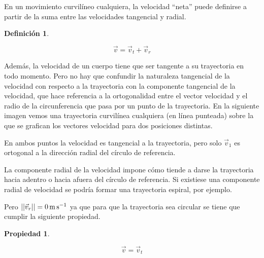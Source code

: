 \documentclass[a5paper,12pt,twoside]{book}
\newtheorem{defn}{{Definición}}[chapter]
\newtheorem{prop}{{Propiedad}}[chapter]
\begin{document}
En un movimiento curvilíneo cualquiera, la velocidad ``neta'' puede definirse a partir de la suma entre las velocidades tangencial y radial.

\begin{mdframed}[style=MyFrame1]
    \begin{defn}
    \end{defn}
    \begin{equation*}
        \Vec{v} = \Vec{v}_t + \Vec{v}_r
    \end{equation*}
\end{mdframed}

Además, la velocidad de un cuerpo tiene que ser tangente a su trayectoria en todo momento. Pero no hay que confundir la naturaleza tangencial de la velocidad con respecto a la trayectoria con la componente tangencial de la velocidad, que hace referencia a la ortogonalidad entre el vector velocidad y el radio de la circunferencia que pasa por un punto de la trayectoria. En la siguiente imagen vemos una trayectoria curvilínea cualquiera (en línea punteada) sobre la que se grafican los vectores velocidad para dos posiciones distintas.

\begin{center}
    \def\svgwidth{\linewidth}
    
\end{center}

En ambos puntos la velocidad es tangencial a la trayectoria, pero solo $\vec{v}_1$ es ortogonal a la dirección radial del círculo de referencia.

La componente radial de la velocidad impone cómo tiende a darse la trayectoria hacia adentro o hacia afuera del círculo de referencia. Si existiese una componente radial de velocidad se podría formar una trayectoria espiral, por ejemplo.

Pero ${\left|\left| {\Vec{v}_r} \right|\right|} = \SI{0}{\metre\per\second}$ ya que para que la trayectoria sea circular se tiene que cumplir la siguiente propiedad.

\begin{mdframed}[style=MyFrame1]
    \begin{prop}
        \label{prop:circularMovVel}
    \end{prop}
    \begin{equation*}
        \Vec{v} = \Vec{v}_t
    \end{equation*}
\end{mdframed}
\end{document}
